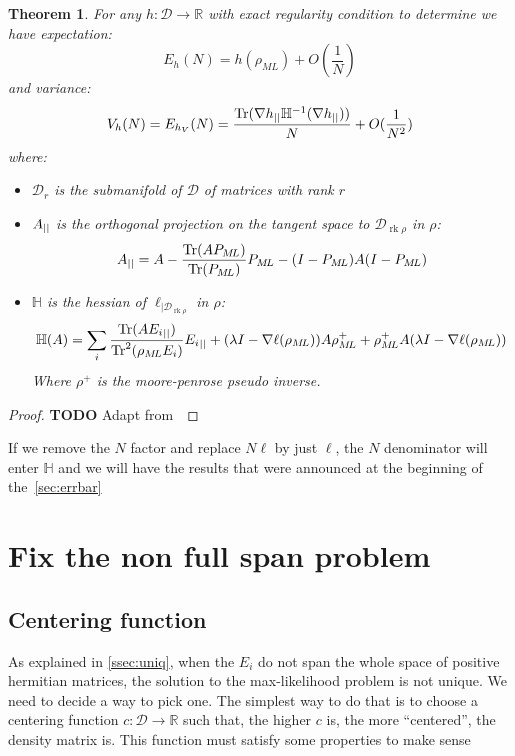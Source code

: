 \documentclass[10pt]{report}
\theoremstyle{plain}
\newtheorem{thm}{Theorem}[chapter]
\theoremstyle{definition}
\theoremstyle{remark}
\newcommand{\R}{\ensuremath{\mathbb{R}}}
\newcommand{\TODO}{\textbf{TODO}}
\DeclareMathOperator{\Tr}{Tr}
\DeclareMathOperator{\rk}{rk}
\newcommand{\ml}{_{M\!L}}
\begin{document}
\begin{thm}
  For any $h : \mathcal{D} \to \R$ with exact regularity condition to determine
  we have expectation:
  \[E_h(N) = h(\rho\ml) + O\left(\frac 1N\right)\]
  and variance:
  \[V_h(N) = E_{h_V}(N) = \frac{\Tr(\nabla h\pr \mathbb H\inv(\nabla h\pr))}N +O(\frac 1 {N^2})\]
  where:
\begin{itemize}
\item $\mathcal{D}_r$ is the submanifold of $\mathcal{D}$ of matrices with rank $r$
\item $A_{||}$ is
  the orthogonal projection on the tangent space to $\mathcal{D}_{\rk \rho}$ in
  $\rho$:
  \[A\pr = A - \frac{\Tr(AP\ml)}{\Tr(P\ml)}P\ml - (I-P\ml)A(I-P\ml)\]
\item $\mathbb H$ is the hessian of $\ell_{|\mathcal{D}_{\rk \rho}}$ in $\rho$:
  \[\mathbb{H}(A) = \sum_i \frac{\Tr(A{E_i}\pr)}{\Tr^2(\rho\ml E_i)} {E_i}\pr +
    (\lambda I - \nabla \ell(\rho\ml))A\rho\ml^+ +
    \rho\ml^+A(\lambda I - \nabla \ell(\rho\ml))\]
  Where $\rho^+$ is the moore-penrose pseudo inverse.
\end{itemize}

\end{thm}

\begin{proof}
\TODO{} Adapt from~\cite{SPRAL17}
\end{proof}


If we remove the $N$ factor and replace $N\ell$ by just $\ell$, the $N$
denominator will enter $\mathbb H$ and we will have the results that were announced at
the beginning of the~\cref{sec:errbar}



\section{Fix the non full span problem}\label{sec:fixspan}

\subsection{Centering function}

As explained in \cref{ssec:uniq}, when the $E_i$ do not span the whole space of
positive hermitian matrices, the solution to the max-likelihood problem is not
unique. We need to decide a way to pick one. The simplest way to do that is to
choose a centering function $c : \mathcal{D} \to \R$ such that, the higher $c$
is, the more ``centered'', the density matrix is. This function must satisfy
some properties to make sense
\end{document}
